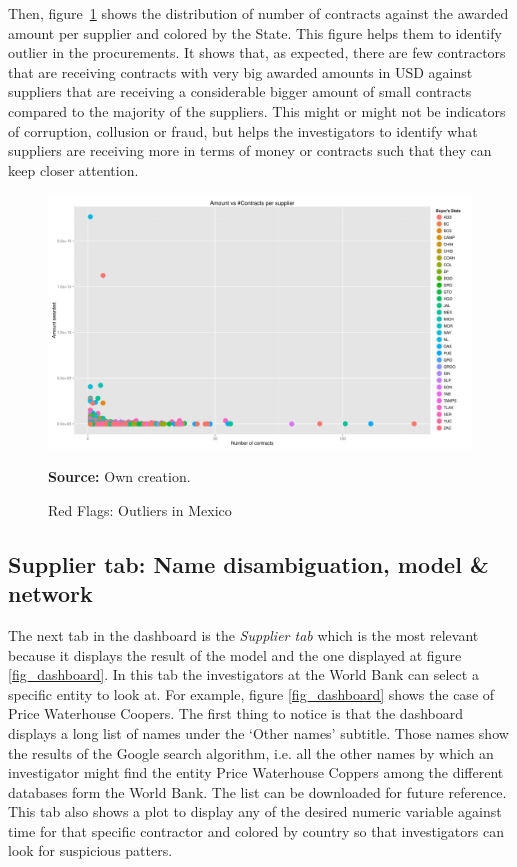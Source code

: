 Then, figure \ref{fig_mex-amount} shows the distribution of number of contracts against the awarded amount per supplier and colored by the State. This figure helps them to identify outlier in the procurements. It shows that, as expected, there are few contractors that are receiving contracts with very big awarded amounts in USD against suppliers that are receiving a considerable bigger amount of small contracts compared to the majority of the suppliers. This might or might not be indicators of corruption, collusion or fraud, but helps the investigators to identify what suppliers are receiving more in terms of money or contracts such that they can  keep closer attention.


\begin{figure}[H]
\begin{center}
\caption{Red Flags: Outliers in Mexico}
\label{fig_mex-amount}
\includegraphics[width=1.05\textwidth,keepaspectratio]{../img/mex-amount-contract.pdf}
\end{center}
\noindent \footnotesize{\textbf{Source:} Own creation.}
\end{figure}

\subsection{Supplier tab: Name disambiguation, model \& network}

The next tab in the dashboard is the \textit{Supplier tab} which is the most relevant because it displays the result of the model and the one displayed at figure \ref{fig_dashboard}. In this tab the investigators at the World Bank can select a specific entity to look at. For example, figure \ref{fig_dashboard} shows the case of Price Waterhouse Coopers. The first thing to notice is that the dashboard displays a long list of names under the `Other names' subtitle. Those names show the results of the Google search algorithm, i.e. all the other names by which an investigator might find the entity Price Waterhouse Coppers among the different databases form the World Bank. The list can be downloaded for future reference. This tab also shows a plot to display any of the desired numeric variable against time  for that specific contractor and colored by country so that investigators can look for suspicious patters.

